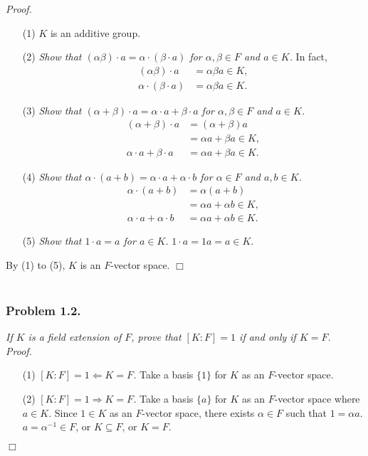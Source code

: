 \documentclass{article}
\begin{document}
\emph{Proof.}
\begin{enumerate}
\item[(1)]
$K$ is an additive group.
\item[(2)]
\emph{Show that $(\alpha \beta) \cdot a = \alpha \cdot (\beta \cdot a)$
for $\alpha, \beta \in F$ and $a \in K$.}
In fact,
\begin{align*}
(\alpha \beta) \cdot a
&= \alpha \beta a \in K, \\
\alpha \cdot (\beta \cdot a)
&= \alpha \beta a \in K.
\end{align*}
\item[(3)]
\emph{Show that $(\alpha + \beta) \cdot a = \alpha \cdot a + \beta \cdot a$
for $\alpha, \beta \in F$ and $a \in K$.}
\begin{align*}
(\alpha + \beta) \cdot a
&= (\alpha + \beta) a \\
&= \alpha a + \beta a \in K, \\
\alpha \cdot a + \beta \cdot a
&= \alpha a + \beta a \in K.
\end{align*}
\item[(4)]
\emph{Show that $\alpha \cdot (a + b) = \alpha \cdot a + \alpha \cdot b$
for $\alpha \in F$ and $a, b \in K$.}
\begin{align*}
\alpha \cdot (a + b)
&= \alpha (a + b) \\
&= \alpha a + \alpha b \in K, \\
\alpha \cdot a + \alpha \cdot b
&= \alpha a + \alpha b \in K.
\end{align*}
\item[(5)]
\emph{Show that $1 \cdot a = a$
for $a \in K$.}
$1 \cdot a = 1 a = a \in K$.
\end{enumerate}
By (1) to (5), $K$ is an $F$-vector space.
$\Box$ \\\\






\subsubsection*{Problem 1.2.}
\emph{If $K$ is a field extension of $F$, prove that $[K:F] = 1$
if and only if $K = F$.} \\

\emph{Proof.}
\begin{enumerate}
\item[(1)]
\emph{$[K:F] = 1 \Longleftarrow K = F$.}
Take a basis $\{1\}$ for $K$ as an $F$-vector space.
\item[(2)]
\emph{$[K:F] = 1 \Longrightarrow K = F$.}
Take a basis $\{a\}$ for $K$ as an $F$-vector space where $a \in K$.
Since $1 \in K$ as an $F$-vector space,
there exists $\alpha \in F$ such that $1 = \alpha a$.
$a = \alpha^{-1} \in F$, or $K \subseteq F$, or $K = F$.
\end{enumerate}
$\Box$ \\\\
\end{document}
